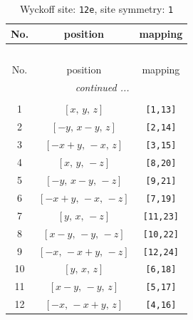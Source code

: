 \documentclass[fleqn,8pt]{jsarticle}
\begin{document}
\begin{longtable}{ccc}
\caption{Wyckoff site: {\tt 12e}, site symmetry: {\tt 1}}
 \\
 \hline \hline
No. & position & mapping \\ \hline \endfirsthead

\multicolumn{2}{l}{\tablename\ \thetable{}} \\
 \hline \hline
No. & position & mapping \\ \hline \endhead

 \hline \hline
\multicolumn{2}{r}{\footnotesize\it continued ...} \\ \endfoot

 \hline \hline
\multicolumn{2}{r}{} \\ \endlastfoot

1 & $\left[ x,\, y,\, z \right]$ & {\tt [1,13]} \\ \hline
2 & $\left[ - y,\, x - y,\, z \right]$ & {\tt [2,14]} \\ \hline
3 & $\left[ - x + y,\, - x,\, z \right]$ & {\tt [3,15]} \\ \hline
4 & $\left[ x,\, y,\, - z \right]$ & {\tt [8,20]} \\ \hline
5 & $\left[ - y,\, x - y,\, - z \right]$ & {\tt [9,21]} \\ \hline
6 & $\left[ - x + y,\, - x,\, - z \right]$ & {\tt [7,19]} \\ \hline
7 & $\left[ y,\, x,\, - z \right]$ & {\tt [11,23]} \\ \hline
8 & $\left[ x - y,\, - y,\, - z \right]$ & {\tt [10,22]} \\ \hline
9 & $\left[ - x,\, - x + y,\, - z \right]$ & {\tt [12,24]} \\ \hline
10 & $\left[ y,\, x,\, z \right]$ & {\tt [6,18]} \\ \hline
11 & $\left[ x - y,\, - y,\, z \right]$ & {\tt [5,17]} \\ \hline
12 & $\left[ - x,\, - x + y,\, z \right]$ & {\tt [4,16]} \\
\end{longtable}
\end{document}
